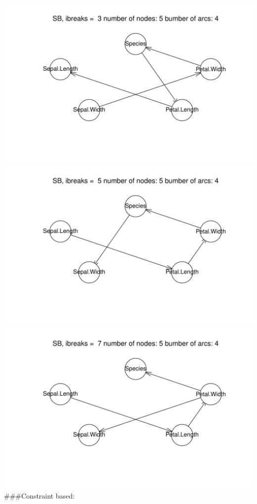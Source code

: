 \documentclass[]{article}
\begin{document}
\includegraphics{BN_Ass2_files/figure-latex/unnamed-chunk-2-2.pdf}
\includegraphics{BN_Ass2_files/figure-latex/unnamed-chunk-2-3.pdf}
\includegraphics{BN_Ass2_files/figure-latex/unnamed-chunk-2-4.pdf}
\#\#\#Constraint based:
\end{document}
